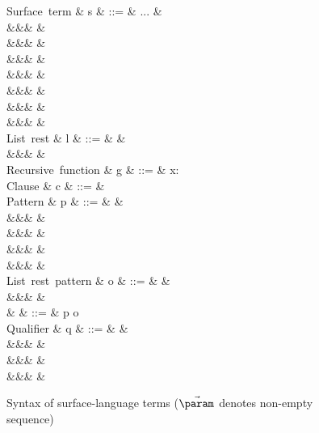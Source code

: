 \begin{figure}[H]
\begin{syntaxfig}
\mbox{Surface term}
&
s
&
::=
&
...
&
\\
&&&
&
\\
&&&
&
\\
&&&
&
\\
&&&
&
\\
&&&
&
\\
&&&
&
\\
&&&
&
\\[2mm]

\mbox{List rest}
&
l
&
::=
&
\annListEnd{\alpha}
&
\\
&&&
&
\\[2mm]

\mbox{Recursive function}
&
g
&
::=
&
x: 
\\[2mm]

\mbox{Clause}
&
c
&
::=
&
\\[2mm]

\mbox{Pattern}
&
p
&
::=
&
&
\\
&&&
\pattNil
&
\\
&&&
&
\\
&&&
&
\\
&&&
&
\\[2mm]

\mbox{List rest pattern}
&
o
&
::=
&
\pattListEnd
&
\\
&&&
&
\\[2mm]

&
\pi
&
::=
&
p \mid o
\\[2mm]

\mbox{Qualifier}
&
q
&
::=
&
&
\\
&&&
&
\\
&&&
&
\\
&&&
\qualDone
&
\\[2mm]

\end{syntaxfig}
\caption{Syntax of surface-language terms ($\vec{\param}$ denotes non-empty sequence)}
\end{figure}
